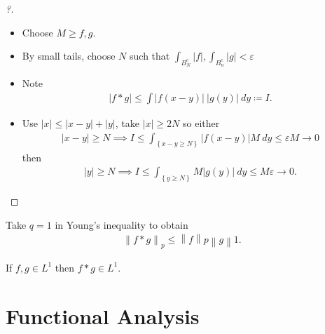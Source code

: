 \begin{proof}[?]

\begin{itemize}
\item
  Choose \(M \geq f,g\).
\item
  By small tails, choose \(N\) such that
  \(\int_{B_{N}^c} {\left\lvert {f} \right\rvert}, \int_{B_{n}^c} {\left\lvert {g} \right\rvert} < \varepsilon\)
\item
  Note
  \begin{align*}
  {\left\lvert {f \ast g} \right\rvert} \leq \displaystyle\int {\left\lvert {f(x-y)} \right\rvert} ~{\left\lvert {g(y)} \right\rvert} ~dy \coloneqq I
  .\end{align*}
\item
  Use
  \({\left\lvert {x} \right\rvert} \leq {\left\lvert {x-y} \right\rvert} + {\left\lvert {y} \right\rvert}\),
  take \({\left\lvert {x} \right\rvert}\geq 2N\) so either
  \begin{align*}
  {\left\lvert {x-y} \right\rvert} \geq N \implies I \leq \int_{\left\{{x-y \geq N}\right\}} {\left\lvert {f(x-y)} \right\rvert}M ~dy\leq \varepsilon M \to 0
  \end{align*}
  then
  \begin{align*}
  {\left\lvert {y} \right\rvert} \geq N \implies I \leq \int_{\left\{{y \geq N}\right\}} M{\left\lvert {g(y)} \right\rvert} ~dy\leq  M \varepsilon \to 0
  .\end{align*}
\end{itemize}

\end{proof}

\begin{proposition}

Take \(q = 1\) in Young's inequality to obtain
\begin{align*}
{\left\lVert {f \ast g} \right\rVert}_{p} \leq {\left\lVert {f} \right\rVert}p {\left\lVert {g} \right\rVert}1
.\end{align*}

\end{proposition}

\begin{proposition}

If \(f, g \in L^1\) then \(f\ast g\in L^1\).

\end{proposition}

\hypertarget{functional-analysis-1}{%
\section{Functional Analysis}\label{functional-analysis-1}}


